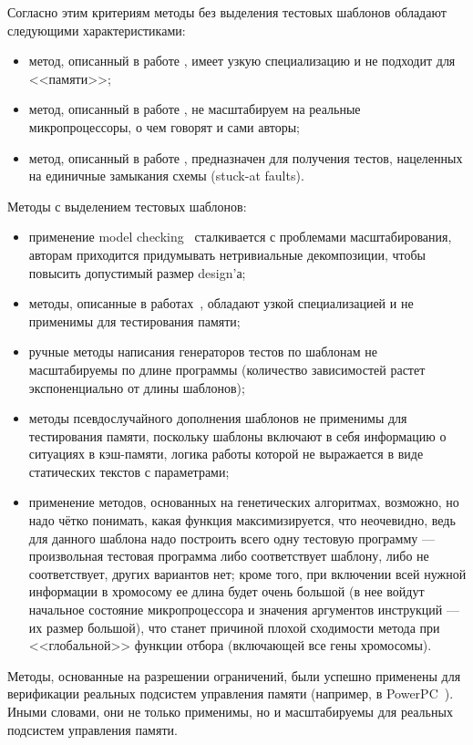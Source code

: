 Согласно этим критериям методы без выделения тестовых шаблонов обладают следующими характеристиками:
\begin{itemize}
	\item метод, описанный в работе \cite{Berkeley89}, имеет узкую специализацию и не подходит для <<памяти>>;
	\item метод, описанный в работе \cite{MishraDutt02}, не масштабируем на реальные микропроцессоры, о чем говорят и сами авторы;
	\item метод, описанный в работе \cite{microGP}, предназначен для получения тестов, нацеленных на единичные замыкания схемы (stuck-at faults).
\end{itemize}

Методы с выделением тестовых шаблонов:
\begin{itemize}
		\item применение model checking~\cite{MishraDutt04} сталкивается с проблемами масштабирования, авторам приходится придумывать нетривиальные декомпозиции, чтобы повысить допустимый размер design'а;
		\item методы, описанные в работах~\cite{MishraDutt05, Branches99}, обладают узкой специализацией и не применимы для тестирования памяти;
		\item ручные методы написания генераторов тестов по шаблонам не масштабируемы по длине программы (количество зависимостей растет экспоненциально от длины шаблонов);
		\item методы псевдослучайного дополнения шаблонов не применимы для тестирования памяти, поскольку шаблоны включают в себя информацию о ситуациях в кэш-памяти, логика работы которой  не выражается в виде статических текстов с параметрами;
		\item применение методов, основанных на генетических алгоритмах, возможно, но надо чётко понимать, какая функция максимизируется, что неочевидно, ведь для данного шаблона надо построить всего одну тестовую программу --- произвольная тестовая программа либо соответствует шаблону, либо не соответствует, других вариантов нет; кроме того, при включении всей нужной информации в хромосому ее длина будет очень большой (в нее войдут начальное состояние микропроцессора и значения аргументов  инструкций --- их размер большой), что станет причиной плохой сходимости метода при <<глобальной>> функции отбора (включающей все гены хромосомы).
\end{itemize}

Методы, основанные на разрешении ограничений, были успешно применены для верификации реальных подсистем управления памяти (например, в PowerPC~\cite{GenesysPro}). Иными словами, они не только применимы, но и масштабируемы для реальных подсистем управления памяти.

